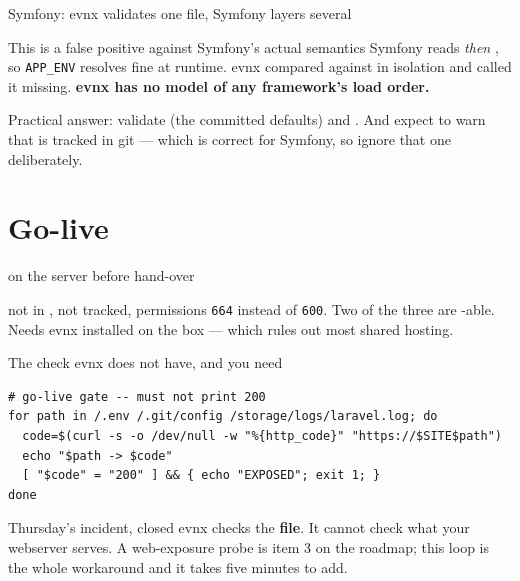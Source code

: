 \documentclass[aspectratio=169,10pt]{beamer}
\begin{document}
\begin{frame}[fragile]{Symfony: evnx validates one file, Symfony layers several}

  \vspace{0.4em}
  \begin{trap}{This is a false positive against Symfony's actual semantics}
    Symfony reads  \emph{then} , so
    \texttt{APP\_ENV} resolves fine at runtime. evnx compared
     against  in isolation and called it
    missing. \textbf{evnx has no model of any framework's load order.}
  \end{trap}

  \vspace{0.4em}
  {\footnotesize Practical answer: validate  (the committed
  defaults) and  . And expect  to warn
  that  is tracked in git --- which is correct for Symfony, so
  ignore that one deliberately.}
\end{frame}

\section{Go-live}

\begin{frame}[fragile]{ on the server before hand-over}

  \vspace{0.3em}
  {\footnotesize {} not in ,  not
  tracked, permissions \texttt{664} instead of \texttt{600}. Two of the three
  are -able. Needs evnx installed on the box --- which rules out
  most shared hosting.}
\end{frame}

\begin{frame}[fragile]{The check evnx does not have, and you need}
\begin{lstlisting}[style=evnxcode]
# go-live gate -- must not print 200
for path in /.env /.git/config /storage/logs/laravel.log; do
  code=$(curl -s -o /dev/null -w "%{http_code}" "https://$SITE$path")
  echo "$path -> $code"
  [ "$code" = "200" ] && { echo "EXPOSED"; exit 1; }
done
\end{lstlisting}

  \vspace{0.7em}
  \begin{block}{Thursday's incident, closed}
    evnx checks the \textbf{file}. It cannot check what your webserver serves.
    A web-exposure probe is item 3 on the roadmap; this loop is the whole
    workaround and it takes five minutes to add.
  \end{block}
\end{frame}
\end{document}
